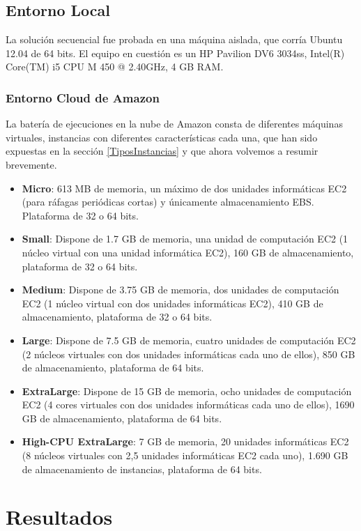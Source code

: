 \documentclass[runningheads]{llncs}
\begin{document}
\subsection{Entorno Local}

La solución secuencial fue probada en una máquina aislada, que corría Ubuntu 12.04 de 64 bits. El equipo en cuestión es un 
HP Pavilion DV6 3034ss, Intel(R) Core(TM) i5 CPU M 450 @ 2.40GHz, 4 GB RAM.

\subsubsection{Entorno Cloud de Amazon}

La batería de ejecuciones en la nube de Amazon consta de diferentes máquinas virtuales, instancias con diferentes características 
cada una, que han sido expuestas en la sección \ref{TiposInstancias} y que ahora volvemos a resumir brevemente.

\begin{itemize}
 \item \textbf{Micro}: 613 MB de memoria, un máximo de dos unidades informáticas EC2 (para ráfagas periódicas cortas) y únicamente  
 almacenamiento EBS. Plataforma de 32 o 64 bits.
 \item \textbf{Small}: Dispone de 1.7 GB de memoria, una unidad de computación EC2 (1 núcleo virtual con una unidad informática EC2), 
 160 GB de almacenamiento, plataforma de 32 o 64 bits.
 \item \textbf{Medium}: Dispone de 3.75 GB de memoria, dos unidades de computación EC2 (1 núcleo virtual con dos unidades 
 informáticas EC2), 410 GB de almacenamiento, plataforma de 32 o 64 bits.
 \item \textbf{Large}: Dispone de 7.5 GB de memoria, cuatro unidades de computación EC2 (2 núcleos virtuales con dos unidades 
 informáticas cada uno de ellos), 850 GB de almacenamiento, plataforma de 64 bits.
 \item \textbf{ExtraLarge}: Dispone de 15 GB de memoria, ocho unidades de computación EC2 (4 cores virtuales con dos unidades 
 informáticas cada uno de ellos), 1690 GB de almacenamiento, plataforma de 64 bits.
 \item \textbf{High-CPU ExtraLarge}:  7 GB de memoria, 20 unidades informáticas EC2 (8 núcleos virtuales 
 con 2,5 unidades informáticas EC2 cada uno), 1.690 GB de almacenamiento de instancias, plataforma de 64 bits.
\end{itemize}

\section{Resultados}
\end{document}
